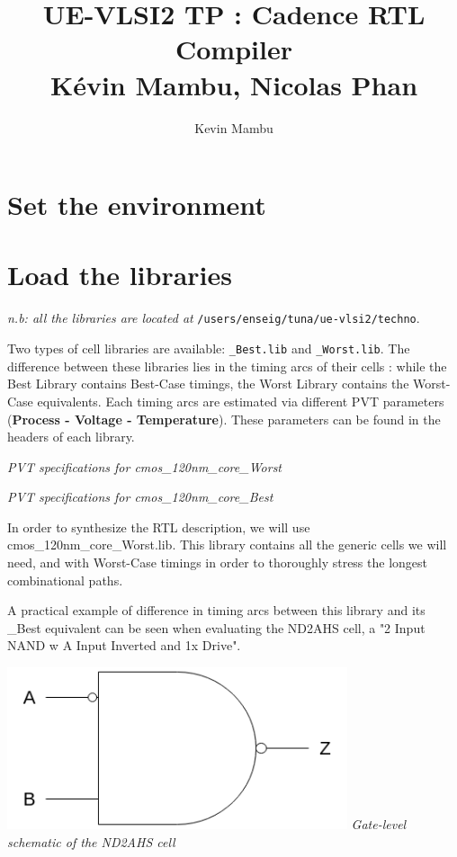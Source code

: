 \documentclass[a4paper]{article}
\author{Kevin Mambu}
\title{UE-VLSI2 TP : Cadence RTL Compiler \\ Kévin Mambu, Nicolas Phan}
\def\code#1{\texttt{#1}}
\begin{document}
\maketitle

\section{Set the environment}




\section{Load the libraries}

{\it n.b: all the libraries are located at} \code{/users/enseig/tuna/ue-vlsi2/techno}.

Two types of cell libraries are available:
\code{\_Best.lib} and \code{\_Worst.lib}. The difference between these libraries
lies in the timing arcs of their cells : while the Best Library contains Best-Case timings,
the Worst Library contains the Worst-Case equivalents. Each timing arcs are estimated via
different PVT parameters (\textbf{Process - Voltage - Temperature}). These parameters can be
found in the headers of each library.


\begin{center}
  \it{PVT specifications for cmos\_120nm\_core\_Worst}
\end{center}

\newpage


\begin{center}
  \it{PVT specifications for cmos\_120nm\_core\_Best}
\end{center}

In order to synthesize the RTL description, we will use cmos\_120nm\_core\_Worst.lib.
This library contains all the generic cells we will need, and with Worst-Case timings
in order to thoroughly stress the longest combinational paths.

A practical example of difference in timing arcs between this library and its \_Best
equivalent can be seen when evaluating the ND2AHS cell, a "2 Input NAND w\/ A Input
Inverted and 1x Drive".

\begin{center}
  \hspace{6em}
  \includegraphics[width=10cm]{./nd2ahs.png} \newline
  \it{Gate-level schematic of the ND2AHS cell}
\end{center}
\end{document}
